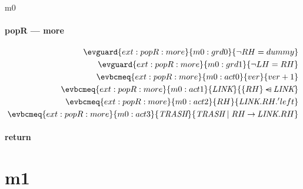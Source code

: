 \documentclass[12pt]{amsart}
\newcommand{\link}{\textit{LINK}}
\newcommand{\trash}{\textit{TRASH}}
\begin{document}
\begin{machine}{m0}
\paragraph{popR --- more}

\begin{align*}
  \evguard{ext:popR:more}
      {m0:grd0}{\neg RH = dummy} \\
  \evguard{ext:popR:more}
      {m0:grd1}{\neg LH = RH} \\
  \evbcmeq{ext:popR:more}{m0:act0}
      {ver}{ver + 1} \\
  \evbcmeq{ext:popR:more}{m0:act1}
      {\link}{ \{RH\} \domsub \link } \\
  \evbcmeq{ext:popR:more}{m0:act2}
      {RH}{ \link.RH.'left } \\
  \evbcmeq{ext:popR:more}{m0:act3}
      {\trash}{ \trash \1| RH \fun \link.RH } \\
\end{align*}

\paragraph{return}

\end{machine}
\section{m1}


\end{document}
